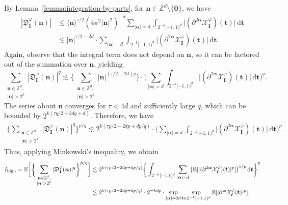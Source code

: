 \documentclass[12pt]{amsart}
\theoremstyle{definition}
\theoremstyle{remark}
\newcommand{\bt}{\boldsymbol{t}}
\newcommand{\Z}{\mathbb{Z}}
\newcommand{\E}{\mathbb{E}}
\numberwithin{equation}{section}
\begin{document}
By Lemma~\ref{lemma:integration-by-parts}, for $\boldsymbol{n}\in \Z^d\setminus\{\boldsymbol{0}\}$, we have
\begin{align*}
|\mathfrak{D}_{\boldsymbol{I}}^\varphi(\boldsymbol{n})|&\le \langle \boldsymbol{n}\rangle^{\tau/2}(4\pi^2|\boldsymbol{n}|^2)^{-d}\sum_{|\boldsymbol{\alpha}|=d}\int_{2^{-k}[-1,1)^d}\big|(\partial^{2\boldsymbol{\alpha}}\mathcal{X}_{\boldsymbol{I}}^\varphi)(\bt)\big|\,\mathrm{d}\bt\\
&\lesssim |\boldsymbol{n}|^{\tau/2-2d}\cdot \sum_{|\boldsymbol{\alpha}|=d}\int_{2^{-k}[-1,1)^d}\big|(\partial^{2\boldsymbol{\alpha}}\mathcal{X}_{\boldsymbol{I}}^\varphi)(\bt)\big|\,\mathrm{d}\bt.
\end{align*}
Again, observe that the integral term does not depend on $\boldsymbol{n}$, so it can be factored out of the summation over $\boldsymbol{n}$, yielding
\[
\sum_{\substack{\boldsymbol{n}\in \Z^d,\\|\boldsymbol{n}|>2^k}} |\mathfrak{D}_{\boldsymbol{I}}^\varphi (\boldsymbol{n})|^q\lesssim \bigg\{\sum_{\substack{\boldsymbol{n}\in \Z^d,\\|\boldsymbol{n}|>2^k}}|\boldsymbol{n}|^{(\tau/2-2d)q}\bigg\}\cdot \bigg(\sum_{|\boldsymbol{\alpha}|=d}\int_{2^{-k}[-1,1)^d}\big|(\partial^{2\boldsymbol{\alpha}}\mathcal{X}_{\boldsymbol{I}}^\varphi)(\bt)\big|\,\mathrm{d}\bt\bigg)^q.
\]
The series about $\boldsymbol{n}$ converges for $\tau<4d$ and sufficiently large $q$, which can be bounded by $2^{k(\tau q/2-2dq+d)}$. Therefore, we have
\begin{align*}
\bigg\{\sum_{\substack{\boldsymbol{n}\in \Z^d,\\|\boldsymbol{n}|>2^k}} |\mathfrak{D}_{\boldsymbol{I}}^\varphi(\boldsymbol{n})|^q\bigg\}^{p/q}\lesssim 2^{k(\tau p/2-2dp+dp/q)}\cdot \bigg(\sum_{|\boldsymbol{\alpha}|=d}\int_{2^{-k}[-1,1)^d}\big|(\partial^{2\boldsymbol{\alpha}}\mathcal{X}_{\boldsymbol{I}}^\varphi)(\bt)\big|\,\mathrm{d}\bt\bigg)^p.
\end{align*}
Thus, applying Minkowski's inequality, we obtain
\begin{align*}
I_{\textnormal{high}}=\E\bigg[\bigg\{\sum_{\substack{\boldsymbol{n}\in \Z^d,\\|\boldsymbol{n}|>2^k}} |\mathfrak{D}_{\boldsymbol{I}}^\varphi(\boldsymbol{n})|^q\bigg\}^{p/q}\bigg]&\lesssim  2^{k(\tau p/2-2dp+dp/q)}\bigg\{\int_{2^{-k}[-1,1)^d} \sum_{|\boldsymbol{\alpha}|=d}\big(\E[|(\partial^{2\boldsymbol{\alpha}}\mathcal{X}_{\boldsymbol{I}}^\varphi)(\bt)|^p]\big)^{1/p}\,\mathrm{d}\bt\bigg\}^p\\
&\lesssim 2^{k(\tau p/2-2dp+dp/q)}\cdot 2^{-kdp}\cdot  \sup_{|\boldsymbol{\alpha}|=2d}\sup_{\bt\in 2^{-k}[-1,1)^d}\E[|\partial^{\boldsymbol{\alpha}}\mathcal{X}_{\boldsymbol{I}}^\varphi(\bt)|^p].
\end{align*}
\end{document}
